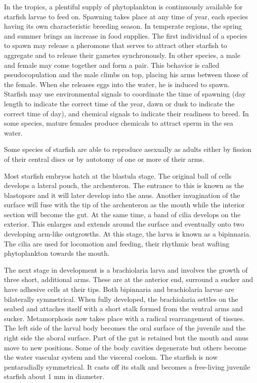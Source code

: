 In the tropics, a plentiful supply of phytoplankton is continuously
available for starfish larvae to feed on. Spawning takes place at any
time of year, each species having its own characteristic breeding
season. In temperate regions, the spring and summer brings an increase
in food supplies. The first individual of a species to spawn may release
a pheromone that serves to attract other starfish to aggregate and to
release their gametes synchronously. In other species, a male and female
may come together and form a pair. This behavior is called
pseudocopulation and the male climbs on top, placing his arms between
those of the female. When she releases eggs into the water, he is
induced to spawn. Starfish may use environmental signals to coordinate
the time of spawning (day length to indicate the correct time of the
year, dawn or dusk to indicate the correct time of day), and chemical
signals to indicate their readiness to breed. In some species, mature
females produce chemicals to attract sperm in the sea water.

Some species of starfish are able to reproduce asexually as adults
either by fission of their central discs or by autotomy of one or more
of their arms.

Most starfish embryos hatch at the blastula stage. The original ball of
cells develops a lateral pouch, the archenteron. The entrance to this is
known as the blastopore and it will later develop into the anus. Another
invagination of the surface will fuse with the tip of the archenteron as
the mouth while the interior section will become the gut. At the same
time, a band of cilia develops on the exterior. This enlarges and
extends around the surface and eventually onto two developing arm-like
outgrowths. At this stage, the larva is known as a bipinnaria. The cilia
are used for locomotion and feeding, their rhythmic beat wafting
phytoplankton towards the mouth.

The next stage in development is a brachiolaria larva and involves the
growth of three short, additional arms. These are at the anterior end,
surround a sucker and have adhesive cells at their tips. Both bipinnaria
and brachiolaria larvae are bilaterally symmetrical. When fully
developed, the brachiolaria settles on the seabed and attaches itself
with a short stalk formed from the ventral arms and sucker.
Metamorphosis now takes place with a radical rearrangement of tissues.
The left side of the larval body becomes the oral surface of the
juvenile and the right side the aboral surface. Part of the gut is
retained but the mouth and anus move to new positions. Some of the body
cavities degenerate but others become the water vascular system and the
visceral coelom. The starfish is now pentaradially symmetrical. It casts
off its stalk and becomes a free-living juvenile starfish about 1 mm in
diameter.

